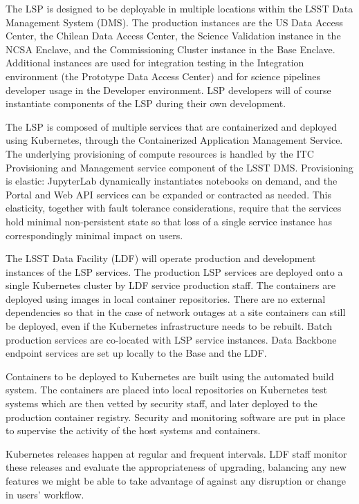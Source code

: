 The LSP is designed to be deployable in multiple locations within the LSST
Data Management System (DMS). The production instances are the US Data
Access Center, the Chilean Data Access Center, the Science Validation
instance in the NCSA Enclave, and the Commissioning Cluster instance in the
Base Enclave. Additional instances are used for integration testing in the
Integration environment (the Prototype Data Access Center) and for science
pipelines developer usage in the Developer environment. LSP developers will
of course instantiate components of the LSP during their own development.

The LSP is composed of multiple services that are containerized and deployed
using Kubernetes, through the Containerized Application Management
Service.  The underlying provisioning of compute resources is handled by the
ITC Provisioning and Management service component of the LSST DMS. Provisioning
is elastic: JupyterLab dynamically instantiates notebooks on demand, and the
Portal and Web API services can be expanded or contracted as needed. This
elasticity, together with fault tolerance considerations, require that the
services hold minimal non-persistent state so that loss of a single service
instance has correspondingly minimal impact on users.

The LSST Data Facility (LDF) will operate production and development instances
of the LSP services. The production LSP services are deployed onto a single
Kubernetes cluster by LDF service production staff. The containers are
deployed using images in local container repositories. There are no external
dependencies so that in the case of network outages at a site containers can
still be deployed, even if the Kubernetes infrastructure needs to be
rebuilt. Batch production services are co-located with LSP service instances.
Data Backbone endpoint services are set up locally to the Base and the LDF.

Containers to be deployed to Kubernetes are built using the automated build
system.  The containers are placed into local repositories on Kubernetes test
systems which are then vetted by security staff, and later deployed to the
production container registry. Security and monitoring software are put in
place to supervise the activity of the host systems and containers.

Kubernetes releases happen at regular and frequent intervals. LDF staff
monitor these releases and evaluate the appropriateness of upgrading,
balancing any new features we might be able to take advantage of against any
disruption or change in users’ workflow.

